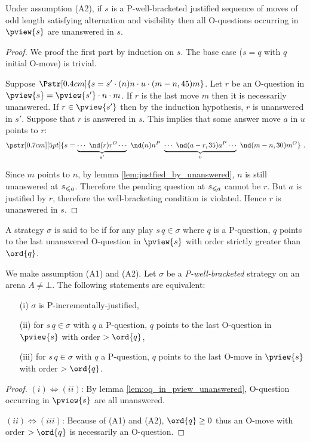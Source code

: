 \begin{lemma}
\label{lem:oq_in_pview_unanswered}
Under assumption (A2), if $s$ is a P-well-bracketed justified sequence of moves of odd length satisfying alternation and visibility then  all O-questions occurring in $\pview{s}$ are unanswered in $s$.
\end{lemma}
\begin{proof}
We proof the first part by induction on $s$.
The base case ($s = q$ with $q$ initial O-move) is trivial.

Suppose $\Pstr[0.4cm]{ s = s' \cdot (n)n \cdot u \cdot (m-n,45){m} }$.
Let $r$ be an O-question in $\pview{s} = \pview{s'} \cdot n \cdot m$.
If $r$ is the last move $m$ then it is necessarily unanswered.
If $r \in \pview{s'}$ then by the induction hypothesis, $r$ is unanswered in $s'$.
Suppose that $r$ is answered in $s$. This implies that some answer move $a$ in $u$ points to $r$:
$$\pstr[0.7cm][5pt]{ s = \underbrace{\cdots\ \nd(r){r}^O \cdots }_{s'} \
\nd(n){n}^P \ \underbrace{\cdots\ \nd(a-r,35){a}^P \cdots }_{u} \
\nd(m-n,30){m}^O } \ .$$
 
Since $m$ points to $n$, by lemma \ref{lem:justfied_by_unanswered}, $n$ is still unanswered at $s_{\leqslant a}$. Therefore the pending
question at $s_{\leqslant a}$ cannot be $r$. But $a$ is justified by $r$, therefore the well-bracketing condition is violated. Hence $r$ is
unanswered in $s$.
\end{proof}





\begin{definition}\rm
  A strategy $\sigma$ is said to be \defname{P-incrementally
    justified} if for any play $s \, q \in \sigma$ where $q$ is a
  P-question, $q$ points to the last unanswered O-question in $\pview{s}$ with
  order strictly greater than $\ord{q}$.
\end{definition}

\begin{proposition}
\label{prop:char_pincr}
\rm We make assumption (A1) and (A2).
Let $\sigma$ be a \emph{P-well-bracketed} strategy on an arena $A\neq \bot$.
The following statements are equivalent:
\begin{enumerate}
\item[(i)] $\sigma$ is P-incrementally-justified,
\item[(ii)] for $s \, q \in \sigma$ with $q$ a P-question, $q$ points to the last O-question in $\pview{s}$ with order $>\ord{q}$,
\item[(iii)] for $s \, q \in \sigma$ with $q$ a P-question, $q$ points to the last O-move in $\pview{s}$ with order $>\ord{q}$.
\end{enumerate}
\end{proposition}
\begin{proof}
$(i)\iff(ii)$: By lemma \ref{lem:oq_in_pview_unanswered}, O-question occurring in $\pview{s}$ are all unanswered.

$(ii)\iff(iii)$: Because of (A1) and (A2), $\ord{q} \geq 0$ thus an O-move with order $>\ord{q}$ is necessarily an O-question.
\end{proof}

